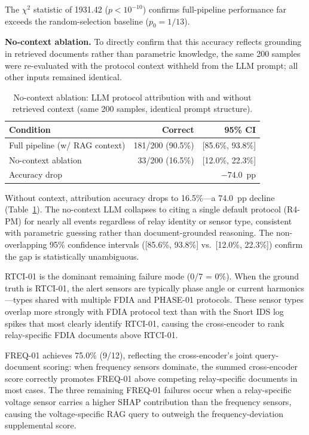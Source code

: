 \documentclass[twocolumn, 10pt, letterpaper]{article}
\begin{document}
The $\chi^2$ statistic of 1931.42 ($p < 10^{-10}$) confirms full-pipeline
performance far exceeds the random-selection baseline ($p_0 = 1/13$).

\textbf{No-context ablation.}
To directly confirm that this accuracy reflects grounding in retrieved documents
rather than parametric knowledge, the same 200 samples were re-evaluated with
the protocol context withheld from the LLM prompt; all other inputs remained
identical.

\begin{table}[H]
\centering
\caption{No-context ablation: LLM protocol attribution with and without
         retrieved context (same 200 samples, identical prompt structure).}
\label{tab:ablation}
\footnotesize
\setlength{\tabcolsep}{3pt}
\begin{tabular}{lrr}
\toprule
\textbf{Condition} & \textbf{Correct} & \textbf{95\% CI} \\
\midrule
Full pipeline (w/ RAG context) & 181/200 (90.5\%) & [85.6\%, 93.8\%] \\
No-context ablation            &  33/200 (16.5\%) & [12.0\%, 22.3\%] \\
\midrule
Accuracy drop & \multicolumn{2}{r}{$-74.0$~pp} \\
\bottomrule
\end{tabular}
\end{table}

Without context, attribution accuracy drops to 16.5\%---a 74.0~pp decline
(Table~\ref{tab:ablation}).
The no-context LLM collapses to citing a single default protocol (R4-PM)
for nearly all events regardless of relay identity or sensor type, consistent
with parametric guessing rather than document-grounded reasoning.
The non-overlapping 95\% confidence intervals ([85.6\%, 93.8\%] vs.\
[12.0\%, 22.3\%]) confirm the gap is statistically unambiguous.

RTCI-01 is the dominant remaining failure mode (0/7 = 0\%).
When the ground truth is RTCI-01, the alert sensors are typically phase angle or
current harmonics---types shared with multiple FDIA and PHASE-01 protocols.
These sensor types overlap more strongly with FDIA protocol text than with the
Snort IDS log spikes that most clearly identify RTCI-01, causing the cross-encoder
to rank relay-specific FDIA documents above RTCI-01.

FREQ-01 achieves 75.0\% (9/12), reflecting the cross-encoder's joint
query-document scoring: when frequency sensors dominate, the summed cross-encoder
score correctly promotes FREQ-01 above competing relay-specific documents in
most cases.
The three remaining FREQ-01 failures occur when a relay-specific voltage sensor
carries a higher SHAP contribution than the frequency sensors, causing the
voltage-specific RAG query to outweigh the frequency-deviation supplemental score.
\end{document}
